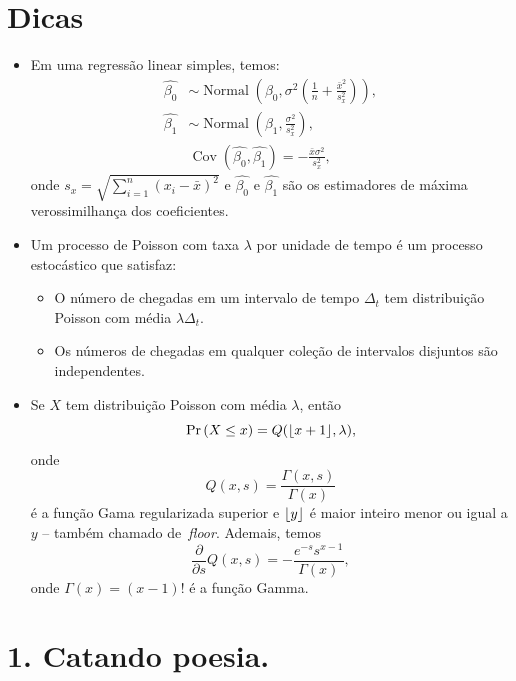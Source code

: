 \documentclass[a4paper,10pt, notitlepage]{report}
\newcommand{\pr}{\operatorname{Pr}} %
\DeclarePairedDelimiter\floor{\lfloor}{\rfloor}
\begin{document}
\section*{Dicas}
\begin{itemize}
 \item Em uma regressão linear simples, temos:
  \begin{align*}
  \hat{\beta_0} &\sim \operatorname{Normal}\left(\beta_0, \sigma^2 \left( \frac{1}{n} + \frac{\bar{x}^2}{s_x^2} \right) \right),\\
  \hat{\beta_1}  &\sim \operatorname{Normal}\left(\beta_1, \frac{\sigma^2}{s_x^2}\right),\\
  &\operatorname{Cov}\left(\hat{\beta_0}, \hat{\beta_1} \right)  = -\frac{\bar{x}\sigma^2}{s_x^2},
 \end{align*}
 onde $s_x = \sqrt{\sum_{i=1}^n (x_i-\bar{x})^2}$ e $\hat{\beta_0}$ e $\hat{\beta_1}$ são os estimadores de máxima verossimilhança dos coeficientes.
 \item Um processo de Poisson com taxa $\lambda$ por unidade de tempo é um processo estocástico que satisfaz:
 \begin{itemize}
  \item O número de chegadas em um intervalo de tempo $\Delta_t$ tem distribuição Poisson com média $\lambda\Delta_t$.
  \item Os números de chegadas em qualquer coleção de intervalos disjuntos são independentes.
 \end{itemize}
 \item Se $X$ tem distribuição Poisson com média $\lambda$, então
 \[\pr\left(X \leq x\right) = Q(\floor*{x + 1}, \lambda), \]
 onde $$Q(x, s) = \frac{\Gamma(x, s)}{\Gamma(x)}$$ é a função Gama regularizada superior e $\floor*{y}$ é maior inteiro menor ou igual a $y$ -- também chamado de~\textit{floor}.
 Ademais, temos
\[ \frac{\partial}{\partial s} Q(x, s) = -\frac{e^{-s}s^{x-1}}{\Gamma(x)},\]
onde $\Gamma(x) = (x-1)!$ é a função Gamma.
 \end{itemize}
 
\newpage

\section*{1. Catando poesia.}
\end{document}
